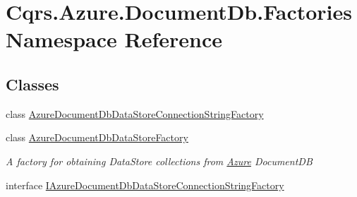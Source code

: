 \hypertarget{namespaceCqrs_1_1Azure_1_1DocumentDb_1_1Factories}{}\section{Cqrs.\+Azure.\+Document\+Db.\+Factories Namespace Reference}
\label{namespaceCqrs_1_1Azure_1_1DocumentDb_1_1Factories}
\subsection*{Classes}
\begin{DoxyCompactItemize}
\item 
class \hyperlink{classCqrs_1_1Azure_1_1DocumentDb_1_1Factories_1_1AzureDocumentDbDataStoreConnectionStringFactory}{Azure\+Document\+Db\+Data\+Store\+Connection\+String\+Factory}
\item 
class \hyperlink{classCqrs_1_1Azure_1_1DocumentDb_1_1Factories_1_1AzureDocumentDbDataStoreFactory}{Azure\+Document\+Db\+Data\+Store\+Factory}
\begin{DoxyCompactList}\small\item\em A factory for obtaining Data\+Store collections from \hyperlink{namespaceCqrs_1_1Azure}{Azure} Document\+DB \end{DoxyCompactList}\item 
interface \hyperlink{interfaceCqrs_1_1Azure_1_1DocumentDb_1_1Factories_1_1IAzureDocumentDbDataStoreConnectionStringFactory}{I\+Azure\+Document\+Db\+Data\+Store\+Connection\+String\+Factory}
\end{DoxyCompactItemize}

